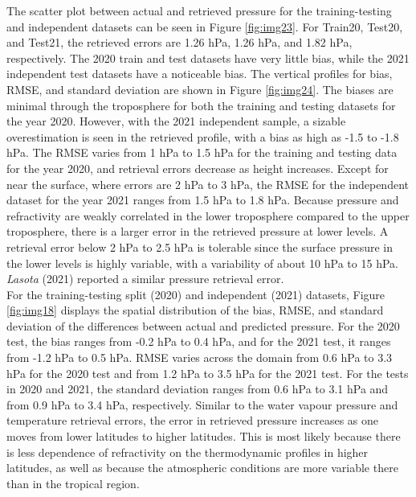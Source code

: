 \documentclass[a4paper,12pt,twoside]{article}
\begin{document}
\noindent  The scatter plot between actual and retrieved pressure for the training-testing and independent datasets can be seen in Figure \ref{fig:img23}. For Train20, Test20, and Test21, the retrieved errors are 1.26 hPa, 1.26 hPa, and 1.82 hPa, respectively. The 2020 train and test datasets have very little bias, while the 2021 independent test datasets have a noticeable bias. The vertical profiles for bias, RMSE, and standard deviation are shown in Figure \ref{fig:img24}. The biases are minimal through the troposphere for both the training and testing datasets for the year 2020. However, with the 2021 independent sample, a sizable overestimation is seen in the retrieved profile, with a bias as high as -1.5 to -1.8 hPa. The RMSE varies from 1 hPa to 1.5 hPa for the training and testing data for the year 2020, and retrieval errors decrease as height increases. Except for near the surface, where errors are 2 hPa to 3 hPa, the RMSE for the independent dataset for the year 2021 ranges from 1.5 hPa to 1.8 hPa. Because pressure and refractivity are weakly correlated in the lower troposphere compared to the upper troposphere, there is a larger error in the retrieved pressure at lower levels.  A retrieval error below 2 hPa to 2.5 hPa is tolerable since the surface pressure in the lower levels is highly variable, with a variability of about 10 hPa to 15 hPa. \textit{Lasota} (2021) reported a similar pressure retrieval error. \\

\noindent For the training-testing split (2020) and independent (2021) datasets, Figure \ref{fig:img18} displays the spatial distribution of the bias, RMSE, and standard deviation of the differences between actual and predicted pressure. For the 2020 test, the bias ranges from -0.2 hPa to 0.4 hPa, and for the 2021 test, it ranges from -1.2 hPa to 0.5 hPa. RMSE varies across the domain from 0.6 hPa to 3.3 hPa for the 2020 test and from 1.2 hPa to 3.5 hPa for the 2021 test. For the tests in 2020 and 2021, the standard deviation ranges from 0.6 hPa to 3.1 hPa and from 0.9 hPa to 3.4 hPa, respectively. Similar to the water vapour pressure and temperature retrieval errors, the error in retrieved pressure increases as one moves from lower latitudes to higher latitudes. This is most likely because there is less dependence of refractivity on the thermodynamic profiles in higher latitudes, as well as because the atmospheric conditions are more variable there than in the tropical region. \\
\end{document}
